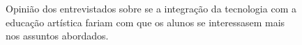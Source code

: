 \documentclass{article}
\begin{document}
	\newpage
	\begin{figure}[H]
		\centering
		\caption{Opinião dos entrevistados sobre se a integração da tecnologia com a educação artística fariam com que os alunos se interessasem mais nos assuntos abordados.}
		\label{fig:q10}
	\end{figure}
\end{document}
